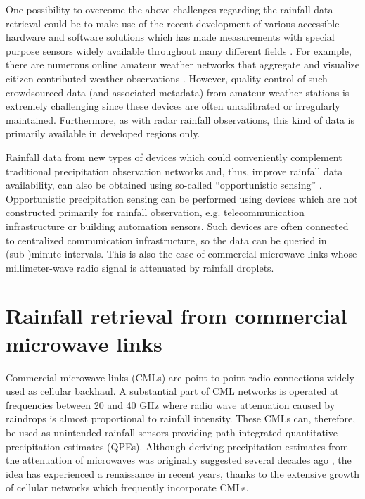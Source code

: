 \documentclass{ctuthesis}\usepackage[]{graphicx}\usepackage[]{color}
\begin{document}
One possibility to overcome the above challenges regarding the rainfall data retrieval could be to make use of the recent development of various accessible hardware and software solutions which has made measurements with special purpose sensors widely available throughout many different fields \citep{swanSensorManiaInternet2012}. For example, there are numerous online amateur weather networks that aggregate and visualize citizen-contributed weather observations \citep{gharesifardBenchmarkingCitizenObservatories2017, devosPotentialUrbanRainfall2017}. However, quality control of such crowdsourced data (and associated metadata) from amateur weather stations is extremely challenging since these devices are often uncalibrated or irregularly maintained. Furthermore, as with radar rainfall observations, this kind of data is primarily available in developed regions only.

Rainfall data from new types of devices which could conveniently complement traditional precipitation observation networks and, thus, improve rainfall data availability, can also be obtained using so-called \enquote{opportunistic sensing} \citep{tauroMeasurementsObservationsXXI2018}. Opportunistic precipitation sensing can be performed using devices which are not constructed primarily for rainfall observation, e.g. telecommunication infrastructure or building automation sensors. Such devices are often connected to centralized communication infrastructure, so the data can be queried in (sub-)minute intervals. This is also the case of commercial microwave links whose millimeter-wave radio signal is attenuated by rainfall droplets.


\section{Rainfall retrieval from commercial microwave links} \label{CMLretrievalTheor}

Commercial microwave links (CMLs) are point-to-point radio connections widely used as cellular backhaul. A substantial part of CML networks is operated at frequencies between 20 and 40 GHz where radio wave attenuation caused by raindrops is almost proportional to rainfall intensity. These CMLs can, therefore, be used as unintended rainfall sensors providing path-integrated quantitative precipitation estimates (QPEs). Although deriving precipitation estimates from the attenuation of microwaves was originally suggested several decades ago \citep{atlasPathAreaIntegratedRainfall1977}, the idea has experienced a renaissance in recent years, thanks to the extensive growth of cellular networks \citep{messer2006environmental, leijnseRainfallMeasurementUsing2007} which frequently incorporate CMLs.
\end{document}
